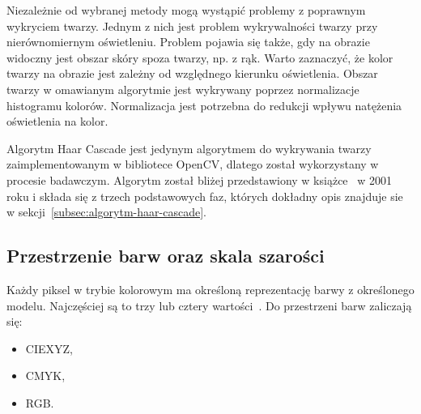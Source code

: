 \documentclass[a4paper,twoside,12pt]{book}
\begin{document}
    Niezależnie od wybranej metody mogą wystąpić problemy z poprawnym wykryciem twarzy.
    Jednym z nich jest problem wykrywalności twarzy przy nierównomiernym oświetleniu.
    Problem pojawia się także, gdy na obrazie widoczny jest obszar skóry spoza twarzy, np. z rąk.
    Warto zaznaczyć, że kolor twarzy na obrazie jest zależny od względnego kierunku oświetlenia.
    Obszar twarzy w omawianym algorytmie jest wykrywany poprzez normalizacje histogramu kolorów.
    Normalizacja jest potrzebna do redukcji wpływu natężenia oświetlenia na kolor.

    Algorytm Haar Cascade jest jedynym algorytmem do wykrywania twarzy zaimplementowanym w bibliotece OpenCV,
    dlatego został wykorzystany w procesie badawczym.
    Algorytm został bliżej przedstawiony w książce~\cite{violaJones} w 2001 roku i składa się z trzech podstawowych faz,
    których dokładny opis znajduje sie w sekcji~\ref{subsec:algorytm-haar-cascade}.


    \subsection{Przestrzenie barw oraz skala szarości}\label{subsec:konwersja-do-skali-szarości-oraz-przestrzenie-barw}
    Każdy piksel w trybie kolorowym ma określoną reprezentację barwy z określonego modelu.
    Najczęściej są to trzy lub cztery
    wartości~\cite{przestrzenieKolorow}.
    Do przestrzeni barw zaliczają się:
    \begin{itemize}
        \item CIEXYZ,
        \item CMYK,
        \item RGB.
    \end{itemize}
\end{document}
